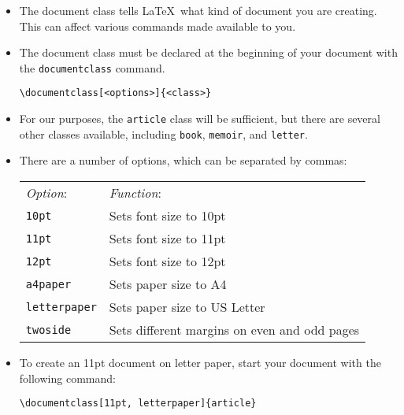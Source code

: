 \documentclass[11pt, letterpaper]{article}
\begin{document}
    \begin{itemize}
      \item The document class tells \LaTeX\ what kind of document you are creating. This can affect various commands made available to you.
      
      \item The document class must be declared at the beginning of your document with the \verb+documentclass+ command.
      
	\begin{exe}
	  \ex \verb!\documentclass[<options>]{<class>}! 
	\end{exe}

      
      \item For our purposes, the \verb+article+ class will be sufficient, but there are several other classes available, including \verb+book+, \verb+memoir+, and \verb+letter+.
      
      \item There are a number of options, which can be separated by commas:
      
	\begin{exe}
	  \ex \begin{tabular}[t]{ll}
	        \textit{Option}: 	& \textit{Function}: \\
	        \verb+10pt+ 		& Sets font size to 10pt \\
	        \verb+11pt+ 		& Sets font size to 11pt \\
	        \verb+12pt+ 		& Sets font size to 12pt \\
	        \verb+a4paper+		& Sets paper size to A4 \\
	        \verb+letterpaper+ 	& Sets paper size to US Letter \\
	        \verb+twoside+		& Sets different margins on even and odd pages \\
	      \end{tabular}

	\end{exe}

      \item To create an 11pt document on letter paper, start your document with the following command:
      
	\begin{exe}
	  \ex \verb!\documentclass[11pt, letterpaper]{article}! 
	\end{exe}

	
    \end{itemize}
\end{document}
